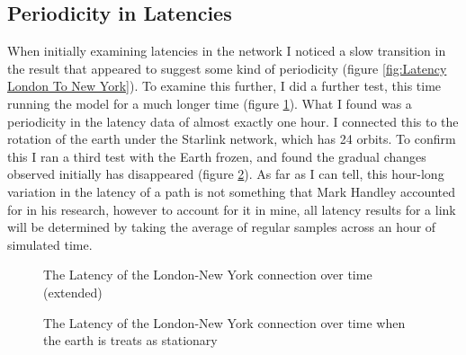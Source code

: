 \documentclass[12pt,a4paper,twoside,openright]{report}
\begin{document}
\subsection{Periodicity in Latencies}

When initially examining latencies in the network I noticed a slow transition in the result that appeared to suggest some kind of periodicity (figure \ref{fig:Latency London To New York}). To examine this further, I did a further test, this time running the model for a much longer time (figure \ref{fig:Latency London To New York Extended}). What I found was a periodicity in the latency data of almost exactly one hour. I connected this to the rotation of the earth under the Starlink network, which has 24 orbits. To confirm this I ran a third test with the Earth frozen, and found the gradual changes observed initially has disappeared (figure \ref{fig:Latency London To New York (Not Accounting for Rotation of Earth)}). As far as I can tell, this hour-long variation in the latency of a path is not something that Mark Handley accounted for in his research, however to account for it in mine, all latency results for a link will be determined by taking the average of regular samples across an hour of simulated time.

\begin{figure}
\caption{The Latency of the London-New York connection over time (extended)}
\label{fig:Latency London To New York Extended}
\end{figure}

\begin{figure}
\caption{The Latency of the London-New York connection over time when the earth is treats as stationary}
\label{fig:Latency London To New York (Not Accounting for Rotation of Earth)}
\end{figure}
\end{document}
